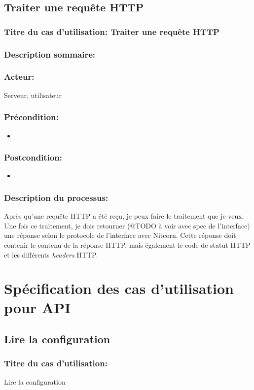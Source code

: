 \documentclass{scrreprt}
\begin{document}
\subsection{Traiter une requête HTTP}
\subsubsection{Titre du cas d'utilisation: Traiter une requête HTTP}
\subsubsection{Description sommaire:}
\subsubsection{Acteur:} Serveur, utilisateur
\subsubsection{Précondition:}
\begin{itemize}
    \item  
\end{itemize} 
\subsubsection{Postcondition:}
\begin{itemize}
    \item  
\end{itemize} 
\subsubsection{Description du processus:}Après qu'une requête HTTP a été reçu, je peux faire le traitement que je veux.
Une fois ce traitement, je dois retourner (@TODO à voir avec spec de l'interface)
une réponse selon le protocole de l'interface avec Nitcorn. Cette réponse doit
contenir le contenu de la réponse HTTP, mais également le code de statut HTTP
et les différents \textit{headers} HTTP.

\section{Spécification des cas d'utilisation pour API}
\subsection{Lire la configuration}
\subsubsection{Titre du cas d'utilisation:} Lire la configuration
\end{document}
